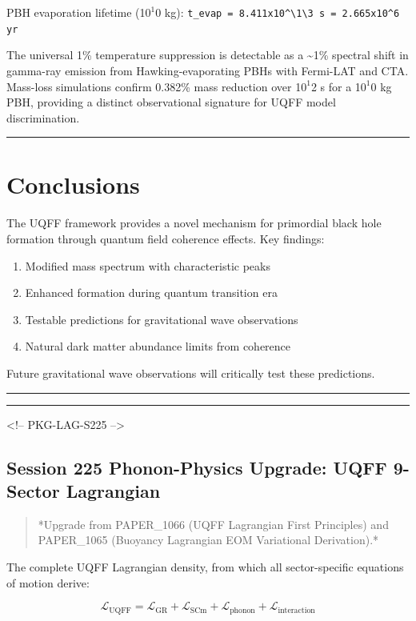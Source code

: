 \documentclass[12pt,a4paper]{article}
\begin{document}
PBH evaporation lifetime (1$0^{1}$0 kg): \texttt{t\_evap = 8.411x10\^{}\textbackslash {1\textbackslash }3 s = 2.665x10\^{}6 yr}

The universal 1\% temperature suppression is detectable as a \textasciitilde{}1\% spectral shift in gamma-ray emission from Hawking-evaporating PBHs with Fermi-LAT and CTA. Mass-loss simulations confirm 0.382\% mass reduction over 1$0^{1}$2 s for a 1$0^{1}$0 kg PBH, providing a distinct observational signature for UQFF model discrimination.

\medskip\hrule\medskip

\section{Conclusions}

The UQFF framework provides a novel mechanism for primordial black hole formation through quantum field coherence effects. Key findings:

\begin{enumerate}
  \item Modified mass spectrum with characteristic peaks
  \item Enhanced formation during quantum transition era
  \item Testable predictions for gravitational wave observations
  \item Natural dark matter abundance limits from coherence
\end{enumerate}

Future gravitational wave observations will critically test these predictions.

\medskip\hrule\medskip

\medskip\hrule\medskip

<!-- PKG-LAG-S225 -->

\subsection{Session 225 Phonon-Physics Upgrade: UQFF 9-Sector Lagrangian}

\begin{quote}
*Upgrade from PAPER\_1066 (UQFF Lagrangian First Principles) and
PAPER\_1065 (Buoyancy Lagrangian EOM Variational Derivation).*
\end{quote}

The complete UQFF Lagrangian density, from which all sector-specific equations of motion derive:

\begin{equation}
\mathcal{L}_{\text{UQFF}} = \mathcal{L}_{\text{GR}} + \mathcal{L}_{\text{SCm}} + \mathcal{L}_{\text{phonon}} + \mathcal{L}_{\text{interaction}}
\end{equation}
\end{document}
